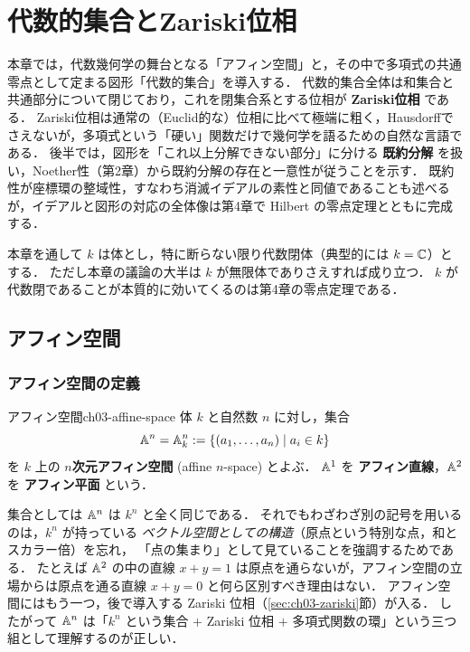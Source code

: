 \chapter{代数的集合とZariski位相}
\label{ch:ch03}

\begin{chapterlead}
本章では，代数幾何学の舞台となる「アフィン空間」と，その中で多項式の共通零点として定まる図形「代数的集合」を導入する．
代数的集合全体は和集合と共通部分について閉じており，これを閉集合系とする位相が \textbf{Zariski位相} である．
Zariski位相は通常の（Euclid的な）位相に比べて極端に粗く，Hausdorffでさえないが，多項式という「硬い」関数だけで幾何学を語るための自然な言語である．
後半では，図形を「これ以上分解できない部分」に分ける \textbf{既約分解} を扱い，Noether性（第2章）から既約分解の存在と一意性が従うことを示す．
既約性が座標環の整域性，すなわち消滅イデアルの素性と同値であることも述べるが，イデアルと図形の対応の全体像は第4章で Hilbert の零点定理とともに完成する．
\end{chapterlead}

本章を通して $k$ は体とし，特に断らない限り代数閉体（典型的には $k=\mathbb{C}$）とする．
ただし本章の議論の大半は $k$ が無限体でありさえすれば成り立つ．
$k$ が代数閉であることが本質的に効いてくるのは第4章の零点定理である．

\section{アフィン空間}

\subsection{アフィン空間の定義}

\begin{mydef}{アフィン空間}{ch03-affine-space}
体 $k$ と自然数 $n$ に対し，集合
\[
  \mathbb{A}^n = \mathbb{A}^n_k := \{(a_1,\dots,a_n) \mid a_i\in k\}
\]
を $k$ 上の \textbf{$n$次元アフィン空間} (affine $n$-space) とよぶ．
$\mathbb{A}^1$ を \textbf{アフィン直線}，$\mathbb{A}^2$ を \textbf{アフィン平面} という．
\end{mydef}

集合としては $\mathbb{A}^n$ は $k^n$ と全く同じである．
それでもわざわざ別の記号を用いるのは，$k^n$ が持っている \emph{ベクトル空間としての構造}（原点という特別な点，和とスカラー倍）を忘れ，
「点の集まり」として見ていることを強調するためである．
たとえば $\mathbb{A}^2$ の中の直線 $x+y=1$ は原点を通らないが，アフィン空間の立場からは原点を通る直線 $x+y=0$ と何ら区別すべき理由はない．
アフィン空間にはもう一つ，後で導入する Zariski 位相（\ref{sec:ch03-zariski}節）が入る．
したがって $\mathbb{A}^n$ は「$k^n$ という集合 $+$ Zariski 位相 $+$ 多項式関数の環」という三つ組として理解するのが正しい．

